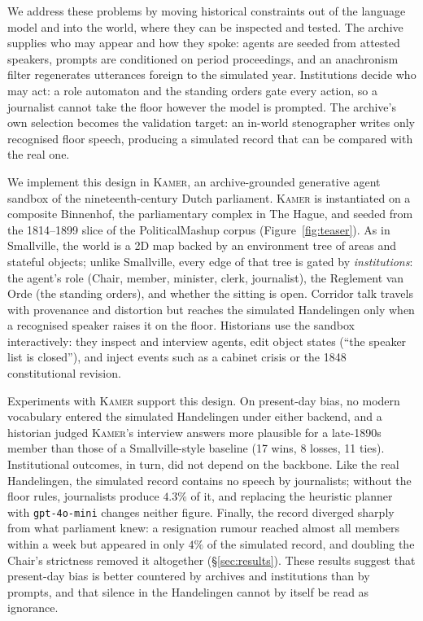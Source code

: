 \documentclass[sigconf,review,anonymous]{acmart}
\newcommand{\sys}{\textsc{Kamer}}
\begin{document}
We address these problems by moving historical constraints out of the
language model and into the world, where they can be inspected and
tested. The archive supplies who may appear and how they spoke: agents
are seeded from attested speakers, prompts are conditioned on period
proceedings, and an anachronism filter regenerates utterances foreign to
the simulated year. Institutions decide who may act: a role automaton and
the standing orders gate every action, so a journalist cannot take the
floor however the model is prompted. The archive's own selection becomes
the validation target: an in-world stenographer writes only recognised
floor speech, producing a simulated record that can be compared with the
real one.

We implement this design in \sys{}, an archive-grounded generative agent
sandbox of the nineteenth-century Dutch parliament. \sys{} is instantiated
on a composite Binnenhof, the parliamentary complex in The Hague, and
seeded from the 1814--1899 slice of the PoliticalMashup corpus
(Figure~\ref{fig:teaser}). As in Smallville, the world is a 2D map backed
by an environment tree of areas and stateful objects; unlike Smallville,
every edge of that tree is gated by \emph{institutions}: the agent's role
(Chair, member, minister, clerk, journalist), the Reglement van Orde (the
standing orders), and whether the sitting is open. Corridor talk travels
with provenance and distortion but reaches the simulated Handelingen only
when a recognised speaker raises it on the floor. Historians use the
sandbox interactively: they inspect and interview agents, edit object
states (``the speaker list is closed''), and inject events such as a
cabinet crisis or the 1848 constitutional revision.

Experiments with \sys{} support this design. On present-day bias, no
modern vocabulary entered the simulated Handelingen under either backend,
and a historian judged \sys{}'s interview answers more plausible for a
late-1890s member than those of a Smallville-style baseline (17 wins,
8 losses, 11 ties). Institutional outcomes, in turn, did not depend on the
backbone. Like the real Handelingen, the simulated record contains no
speech by journalists; without the floor rules, journalists produce
$4.3\%$ of it, and replacing the heuristic planner with
\texttt{gpt-4o-mini} changes neither figure. Finally, the record diverged
sharply from what parliament knew: a resignation rumour reached almost all
members within a week but appeared in only $4\%$ of the simulated record,
and doubling the Chair's strictness removed it altogether
(\S\ref{sec:results}). These results suggest that present-day bias is
better countered by archives and institutions than by prompts, and that
silence in the Handelingen cannot by itself be read as ignorance.
\end{document}
